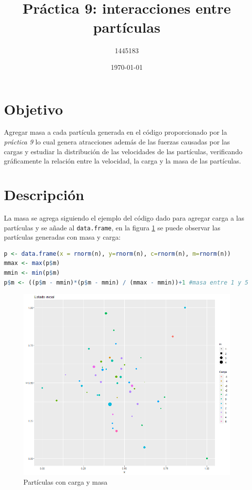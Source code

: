 \documentclass{article}
\author{1445183}
\title{Práctica 9: interacciones entre partículas}
\date{\today}
\begin{document}
\maketitle

\section{Objetivo}
Agregar masa a cada partícula generada en el código proporcionado por la \textit{práctica 9} lo cual genera atracciones además de las fuerzas causadas por las cargas y estudiar la distribución de las velocidades de las partículas, verificando gráficamente la relación entre la velocidad, la carga y la masa de las partículas.

\section{Descripción}
La masa se agrega siguiendo el ejemplo del código dado para agregar carga a las partículas \cite{elisaweb9} y se añade al \texttt{data.frame}, en la figura \ref{parmas} se puede observar las partículas generadas con masa y carga:
\begin{lstlisting}[language=R]
p <- data.frame(x = rnorm(n), y=rnorm(n), c=rnorm(n), m=rnorm(n))
mmax <- max(p$m)
mmin <- min(p$m)
p$m <- ((p$m - mmin)*(p$m - mmin) / (mmax - mmin))+1 #masa entre 1 y 5
\end{lstlisting}

\begin{figure}[h!]
\centering\includegraphics[width=120mm]{p9_t0.png}
\caption{Partículas con carga y masa}
\label{parmas}
\end{figure}
\end{document}
